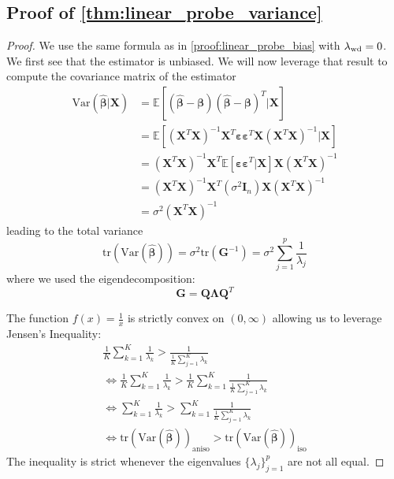 \subsection{Proof of \cref{thm:linear_probe_variance}}
\label{proof:linear_probe_variance}
\begin{proof}
We use the same formula as in \cref{proof:linear_probe_bias} with $\lambda_{\rm wd}=0$. We first see that the estimator is unbiased. We will now leverage that result to compute the covariance matrix of the estimator 
\begin{align*}
\text{Var}(\hat{\boldsymbol{\beta}}|\mathbf{X}) &= \mathbb{E}[(\hat{\boldsymbol{\beta}} - \boldsymbol{\beta})(\hat{\boldsymbol{\beta}} - \boldsymbol{\beta})^T|\mathbf{X}]\\
&= \mathbb{E}[(\mathbf{X}^T\mathbf{X})^{-1}\mathbf{X}^T\boldsymbol{\varepsilon}\boldsymbol{\varepsilon}^T\mathbf{X}(\mathbf{X}^T\mathbf{X})^{-1}|\mathbf{X}]\\
&= (\mathbf{X}^T\mathbf{X})^{-1}\mathbf{X}^T\mathbb{E}[\boldsymbol{\varepsilon}\boldsymbol{\varepsilon}^T|\mathbf{X}]\mathbf{X}(\mathbf{X}^T\mathbf{X})^{-1}\\
&= (\mathbf{X}^T\mathbf{X})^{-1}\mathbf{X}^T(\sigma^2\mathbf{I}_n)\mathbf{X}(\mathbf{X}^T\mathbf{X})^{-1}\\
&= \sigma^2(\mathbf{X}^T\mathbf{X})^{-1}
\end{align*}
leading to the total variance
$$\text{tr}(\text{Var}(\hat{\boldsymbol{\beta}})) = \sigma^2\text{tr}(\mathbf{G}^{-1})=\sigma^2 \sum_{j=1}^p \frac{1}{\lambda_j}$$
where we used the eigendecomposition:
$$\mathbf{G} = \mathbf{Q}\boldsymbol{\Lambda}\mathbf{Q}^T$$



The function $f(x) = \frac{1}{x}$ is strictly convex on $(0, \infty)$ allowing us to leverage Jensen's Inequality:
\begin{align*}
    \frac{1}{K}\sum_{k=1}^K \frac{1}{\lambda_k} > \frac{1}{\frac{1}{K}\sum_{j=1}^K \lambda_k}\\
    \iff \frac{1}{K}\sum_{k=1}^K \frac{1}{\lambda_k} > \frac{1}{K}\sum_{k=1}^{K}\frac{1}{\frac{1}{K}\sum_{j=1}^K \lambda_k}\\
    \iff \sum_{k=1}^K \frac{1}{\lambda_k} > \sum_{k=1}^{K}\frac{1}{\frac{1}{K}\sum_{j=1}^K \lambda_k}\\
    \iff \text{tr}(\text{Var}(\hat{\boldsymbol{\beta}}))_{\text{aniso}} > \text{tr}(\text{Var}(\hat{\boldsymbol{\beta}}))_{\text{iso}}
\end{align*}
The inequality is strict whenever the eigenvalues $\{\lambda_j\}_{j=1}^p$ are not all equal.
\end{proof}











